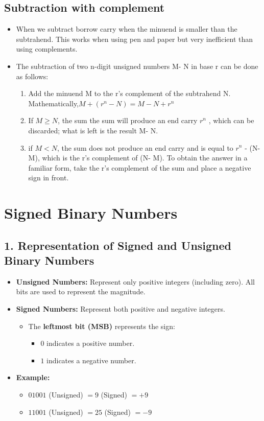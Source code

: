 \documentclass[a4paper,12pt]{article}
\begin{document}
\subsection{Subtraction with complement}
\begin{itemize}
    \item When we subtract borrow carry when the minuend is smaller than the subtrahend. This works when using pen and paper but very inefficient than using complements.
    \item The subtraction of two n-digit unsigned numbers M- N in base r can be done as follows:
    \begin{enumerate}
        \item Add the minuend M to the r’s complement of the subtrahend N. Mathematically,$M+(r^n-N)=M-N+r^n$
        \item If $M \geq N$, the sum the sum will produce an end carry $r^n$
, which can be discarded; what is
left is the result M- N.
        \item if $M<N$, the sum does not produce an end carry and is equal to $r^n$
- (N- M),
which is the r’s complement of (N- M). To obtain the answer in a familiar form,
take the r’s complement of the sum and place a negative sign in front.
    \end{enumerate}
\end{itemize}

\newpage

\section{Signed Binary Numbers}

\subsection*{1. Representation of Signed and Unsigned Binary Numbers}

\begin{itemize}
    \item \textbf{Unsigned Numbers:} Represent only positive integers (including zero). All bits are used to represent the magnitude.
    \item \textbf{Signed Numbers:} Represent both positive and negative integers.
    \begin{itemize}
        \item The \textbf{leftmost bit (MSB)} represents the sign:
        \begin{itemize}
            \item $0$ indicates a positive number.
            \item $1$ indicates a negative number.
        \end{itemize}
    \end{itemize}
    \item \textbf{Example:}
    \begin{itemize}
        \item $01001$ (Unsigned) $= 9$ \quad (Signed) $= +9$
        \item $11001$ (Unsigned) $= 25$ \quad (Signed) $= -9$
    \end{itemize}
\end{itemize}
\end{document}
